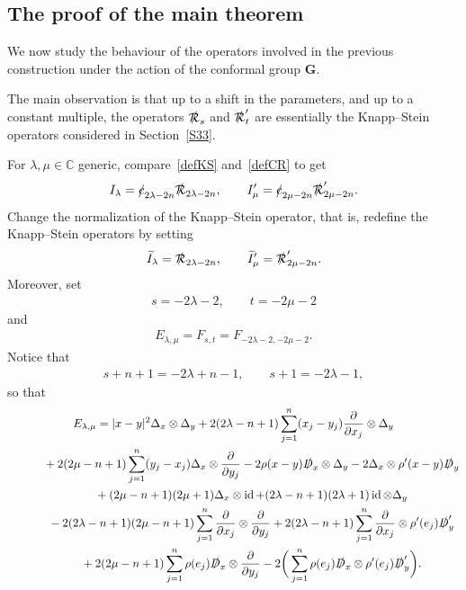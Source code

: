 \documentclass[pdftex]{sigma}
\DeclareMathOperator{\id}{id}
\newcommand{\fsl}[1]{{\slashed{#1}}} %
\numberwithin{equation}{section}
\begin{document}
\subsection{The proof of the main theorem}
We now study the behaviour of the operators involved in the previous construction under the action of the conformal group $\mathbf G$.

The main observation is that up to a shift in the parameters, and up to a constant multiple, the operators $\fsl{\mathcal R}_s$ and $\fsl{\mathcal R}'_t$ are essentially the Knapp--Stein operators considered in Section~\ref{S33}.

For $\lambda, \mu\in \mathbb C$ generic, compare~\eqref{defKS} and~\eqref{defCR} to get
\begin{gather*}
I_\lambda = \fsl{c}_{2\lambda- 2n} \fsl{\mathcal R}_{2\lambda- 2n}, \qquad I'_\mu = \fsl{c}_{2\mu-2n} \fsl{\mathcal R}'_{2\mu-2n}. \end{gather*}
 Change the normalization of the Knapp--Stein operator, that is, redefine the
 Knapp--Stein ope\-ra\-tors by setting
 \begin{gather*}
 \widetilde I_\lambda = \fsl{\mathcal R}_{2\lambda-2n},\qquad \widetilde I'_\mu = \fsl{\mathcal R}'_{2\mu-2n}.
 \end{gather*}
 Moreover, set
 \begin{gather*}
 s= -2\lambda-2,\qquad t=-2\mu-2
 \end{gather*}
 and
 \begin{gather*}
 E_{\lambda,\mu} = F_{s,t} =F_{-2\lambda-2, -2\mu-2}.
 \end{gather*}
Notice that
\begin{gather*}
s+n+1 =-2\lambda+n-1, \qquad
s+1 = -2\lambda-1,
\end{gather*}
so that
\begin{gather}
E_{\lambda,\mu} = \vert x-y\vert^2 \Delta_x\otimes \Delta_y
+2(2\lambda-n+1) \sum_{j=1}^n (x_j-y_j) \frac{\partial}{\partial x_j} \otimes \Delta_y\nonumber
\\ \hphantom{E_{\lambda,\mu} =}
{}+ 2(2\mu-n+1) \sum_{j=1}^n (y_j-x_j) \Delta_x\otimes \frac{\partial}{\partial y_j}
-2\rho(x-y)\fsl{D}_x\otimes \Delta_y - 2 \Delta_x\otimes \rho'(x-y) \fsl{D}_y\nonumber
\\ \hphantom{E_{\lambda,\mu} =}
{}+(2\mu-n+1)(2\mu+1) \Delta_x\otimes \id + (2\lambda-n+1) (2\lambda+1)\id\otimes\Delta_y\nonumber
\\ \hphantom{E_{\lambda,\mu} =}
{} -2(2\lambda-n+1)(2\mu-n+1) \sum_{j=1}^n \frac{\partial}{\partial x_j} \otimes \frac{\partial}{\partial y_j}
+2(2\lambda-n+1) \sum_{j=1}^n \frac{\partial}{\partial x_j}\otimes \rho'(e_j)\fsl{D}'_y\nonumber
\\ \hphantom{E_{\lambda,\mu} =}
{}+2(2\mu-n+1)\sum_{j=1}^n \rho(e_j)\fsl{D}_x\otimes \frac{\partial}{\partial y_j}
- 2\bigg(\sum_{j=1}^n \rho(e_j)\fsl{D}_x\otimes \rho'(e_j)\fsl{D}'_y\bigg).\label{Elambdamu}
\end{gather}
\end{document}
